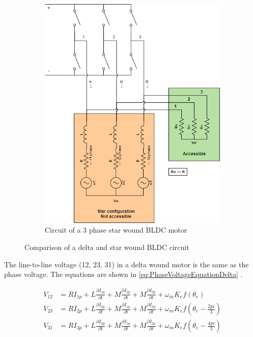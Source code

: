 \documentclass[]{report}
\begin{document}
\begin{figure}[H]
\begin{subfigure}{0.49\textwidth}
		\label{fig:DeltaPhaseCircuit}
	\end{subfigure}
	\hfill
	\begin{subfigure}{0.49\textwidth}
		\centering
		\includegraphics[width=\textwidth]{Draw_IO/BLDC_Dynamics_starCircuit.png}
		\caption{Circuit of a 3 phase star wound BLDC motor}
		\label{fig:StarPhaseCircuit}
	\end{subfigure}
	\caption{Comparison of a delta and star wound BLDC circuit}
	\label{fig:DeltaAndStarWoundCircuit}
\end{figure}

The line-to-line voltage (12, 23, 31) in a delta wound motor is the same as the phase voltage. The equations are shown in \autoref{eq:PhaseVoltageEquationDelta} \cite{BLDC_winding_models}.

\begin{equation} \label{eq:PhaseVoltageEquationDelta}
	\begin{split}
		V_{12} &= RI_{1p} + L\frac{\partial I_{1p}}{\partial t} + M\frac{\partial I_{2p}}{\partial t} + M\frac{\partial I_{3p}}{\partial t} + \omega_m K_e f\left(\theta_e\right) \\
		V_{23} &= RI_{2p} + L\frac{\partial I_{2p}}{\partial t} + M\frac{\partial I_{1p}}{\partial t} + M\frac{\partial I_{3p}}{\partial t} + \omega_m K_e f\left(\theta_e - \frac{2pi}{3}\right) \\
		V_{31} &= RI_{3p} + L\frac{\partial I_{3p}}{\partial t} + M\frac{\partial I_{1p}}{\partial t} + M\frac{\partial I_{2p}}{\partial t} + \omega_m K_e f\left(\theta_e - \frac{4pi}{3}\right)
	\end{split}
\end{equation}
\end{document}
